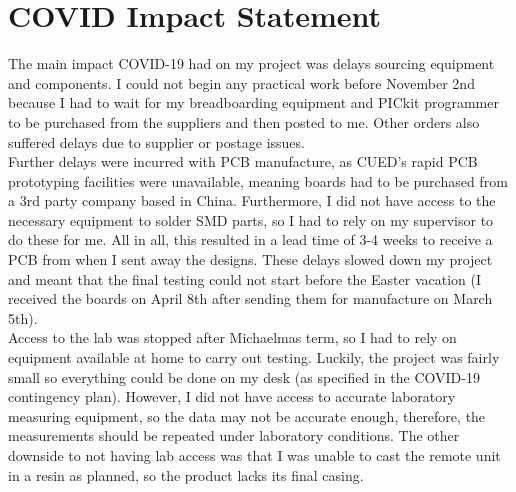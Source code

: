 \newpage
\onehalfspacing
\section{COVID Impact Statement}
The main impact COVID-19 had on my project was delays sourcing equipment and components. I could not begin any practical work before November 2nd because I had to wait for my breadboarding equipment and PICkit programmer to be purchased from the suppliers and then posted to me. Other orders also suffered delays due to supplier or postage issues.\\

Further delays were incurred with PCB manufacture, as CUED's rapid PCB prototyping facilities were unavailable, meaning boards had to be purchased from a 3rd party company based in China. Furthermore, I did not have access to the necessary equipment to solder SMD parts, so I had to rely on my supervisor to do these for me. All in all, this resulted in a lead time of 3-4 weeks to receive a PCB from when I sent away the designs. These delays slowed down my project and meant that the final testing could not start before the Easter vacation (I received the boards on April 8th after sending them for manufacture on March 5th).\\

Access to the lab was stopped after Michaelmas term, so I had to rely on equipment available at home to carry out testing. Luckily, the project was fairly small so everything could be done on my desk (as specified in the COVID-19 contingency plan). However, I did not have access to accurate laboratory measuring equipment, so the data may not be accurate enough, therefore, the measurements should be repeated under laboratory conditions. The other downside to not having lab access was that I was unable to cast the remote unit in a resin as planned, so the product lacks its final casing.




